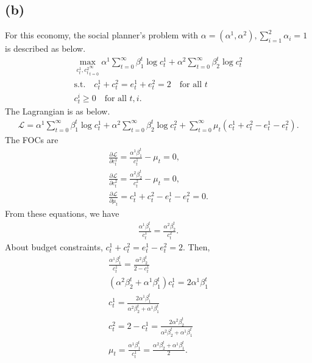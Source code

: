 \documentclass[a4paper]{article}
\begin{document}
\subsection*{(b)}
For this economy, the social planner's problem with $\alpha = (\alpha^1, \alpha^2), \sum_{i=1}^{2} \alpha_i=1$ is described as below.
\begin{gather*}
    \max_{{c_t^1, c_t^2}_{t=0}^\infty} \alpha^1 \sum_{t=0}^{\infty} \beta_1^t \log c_t^1 + \alpha^2 \sum_{t=0}^{\infty} \beta_2^t \log c_t^2\\
    \text{s.t.} \quad c_t^1 + c_t^2 = e_t^1 + e_t^2 = 2\quad \text{for all } t\\
    c_t^i \geq 0 \quad \text{for all } t,i.
\end{gather*}  
The Lagrangian is as below.
\begin{gather*}
    \mathcal{L} = \alpha^1 \sum_{t=0}^{\infty} \beta_1^t \log c_t^1 + \alpha^2 \sum_{t=0}^{\infty} \beta_2^t \log c_t^2 +\sum_{t=0}^{\infty}  \mu_t (c_t^1 + c_t^2 - e_t^1 - e_t^2).
\end{gather*}
The FOCs are
\begin{gather*}
    \frac{\partial \mathcal{L}}{\partial c_t^1} = \frac{\alpha^1 \beta_1^t}{c_t^1} - \mu_t = 0,\\
    \frac{\partial \mathcal{L}}{\partial c_t^2} = \frac{\alpha^2 \beta_2^t}{c_t^2} - \mu_t = 0,\\
    \frac{\partial \mathcal{L}}{\partial \mu_t} = c_t^1 + c_t^2 - e_t^1 - e_t^2 = 0.
\end{gather*}
From these equations, we have
\begin{gather*}
    \frac{\alpha^1 \beta_1^t}{c_t^1} = \frac{\alpha^2 \beta_2^t}{c_t^2}.
\end{gather*}
About budget constraints, $c_t^1 + c_t^2 = e_t^1 - e_t^2=2$. Then,
\begin{gather*}
    \frac{\alpha^1 \beta_1^t}{c_t^1} = \frac{\alpha^2 \beta_2^t}{2-c_t^1}\\
    (\alpha^2 \beta_2^t + \alpha^1 \beta_1^t) c_t^1 = 2 \alpha^1 \beta_1^t\\
    c_t^1 = \frac{2 \alpha^1 \beta_1^t}{\alpha^2 \beta_2^t + \alpha^1 \beta_1^t}\\
    c_t^2 = 2-c_t^1 = \frac{2 \alpha^2 \beta_2^t}{\alpha^2 \beta_2^t + \alpha^1 \beta_1^t}\\
    \mu_t = \frac{\alpha^1 \beta_1^t}{c_t^1} = \frac{\alpha^2 \beta_2^t + \alpha^1 \beta_1^t}{2}.
\end{gather*}
\end{document}
